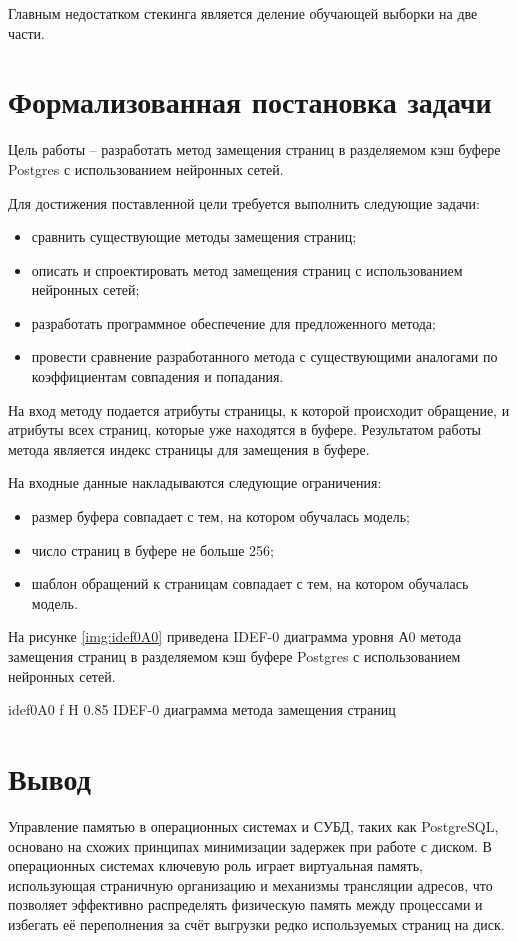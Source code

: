 Главным недостатком стекинга является деление обучающей выборки на две части.

\section{Формализованная постановка задачи}
Цель работы -- разработать метод замещения страниц в разделяемом кэш буфере Postgres с использованием нейронных сетей.

Для достижения поставленной цели требуется выполнить следующие задачи:
\begin{itemize}
	\item сравнить существующие методы замещения страниц;
	\item описать и спроектировать метод замещения страниц с использованием нейронных сетей;
	\item разработать программное обеспечение для предложенного метода;
	\item провести сравнение разработанного метода с существующими аналогами по коэффициентам совпадения и попадания.
\end{itemize}

На вход методу подается атрибуты страницы, к которой происходит обращение, и атрибуты всех страниц, которые уже находятся в буфере.
Результатом работы метода является индекс страницы для замещения в буфере.

На входные данные накладываются следующие ограничения:
\begin{itemize}
	\item размер буфера совпадает с тем, на котором обучалась модель;
	\item число страниц в буфере не больше 256;
	\item шаблон обращений к страницам совпадает с тем, на котором обучалась модель.
\end{itemize}

На рисунке \ref{img:idef0A0} приведена IDEF-0 диаграмма уровня А0 метода замещения страниц в разделяемом кэш буфере Postgres с использованием нейронных сетей.

{idef0A0} %
{f} %
{H} %
{0.85\textwidth} %
{IDEF-0 диаграмма метода замещения страниц} %

\section{Вывод}
Управление памятью в операционных системах и СУБД, таких как PostgreSQL, основано на схожих принципах минимизации задержек при работе с диском.
В операционных системах ключевую роль играет виртуальная память, использующая страничную организацию и механизмы трансляции адресов, что позволяет эффективно распределять физическую память между процессами и избегать её переполнения за счёт выгрузки редко используемых страниц на диск. 

